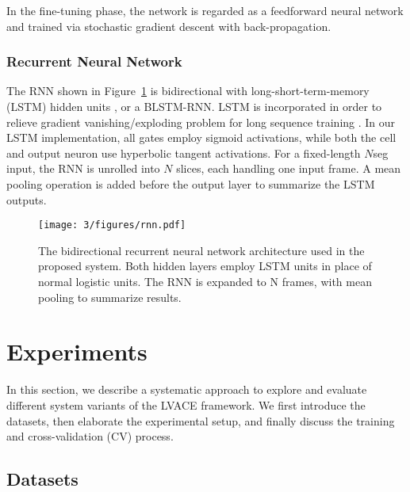 In the fine-tuning phase, the network is regarded as a feedforward neural network and trained via stochastic gradient descent with back-propagation.

\subsubsection{Recurrent Neural Network}

The RNN shown in Figure~\ref{fig:3-rnn} is bidirectional with long-short-term-memory (LSTM) hidden units \cite{hochreiter1997long}, or a BLSTM-RNN. LSTM is incorporated in order to relieve gradient vanishing/exploding problem for long sequence training \cite{bengio2009learning}. In our LSTM implementation, all gates employ sigmoid activations, while both the cell and output neuron use hyperbolic tangent activations. For a fixed-length $N$seg input, the RNN is unrolled into $N$ slices, each handling one input frame. A mean pooling operation is added before the output layer to summarize the LSTM outputs.

\begin{figure}[h]
\centering
\texttt{[image: 3/figures/rnn.pdf]}
\caption{The bidirectional recurrent neural network architecture used in the proposed system. Both hidden layers employ LSTM units in place of normal logistic units. The RNN is expanded to N frames, with mean pooling to summarize results.}
\label{fig:3-rnn}
\end{figure}

\section{Experiments} \label{sec:3-exper}
In this section, we describe a systematic approach to explore and evaluate different system variants of the LVACE framework. We first introduce the datasets, then elaborate the experimental setup, and finally discuss the training and cross-validation (CV) process.

\subsection{Datasets}

